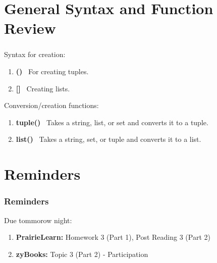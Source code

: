\documentclass{beamer}
\begin{document}
\section{General Syntax and Function Review}

%
%
\begin{frame}[fragile]
  \frametitle{}
  Syntax for creation:
  \begin{enumerate}
    \item \textbf{()} \textrightarrow \ For creating tuples.
    \item \textbf{[]} \textrightarrow \ Creating lists.
  \end{enumerate}
  \vfill
  Conversion/creation functions:
  \begin{enumerate}
    \item \textbf{tuple()} \textrightarrow \ Takes a string, list, or set and converts it to a tuple.
    \item \textbf{list()} \ Takes a string, set, or tuple and converts it to a list.
  \end{enumerate}
\end{frame}

\section{Reminders}

\begin{frame}
  \frametitle{Reminders}
  Due tommorow night:
  \begin{enumerate}
    \item \textbf{PrairieLearn: } Homework 3 (Part 1), Post Reading 3 (Part 2)
    \item \textbf{zyBooks: } Topic 3 (Part 2) - Participation
  \end{enumerate}
\end{frame}
\end{document}
